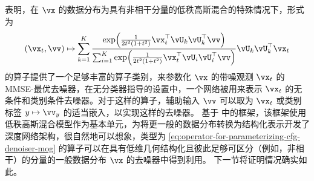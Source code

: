 \documentclass[../../book-main_zh.tex]{subfiles}
\begin{document}
 表明，在 $\vx$ 的数据分布为具有非相干分量的低秩高斯混合的特殊情况下，形式为
\begin{equation}\label{eq:operator-for-parameterizing-cfg-denoiser-mog}
  (\vx_t, \vv) \mapsto
  \sum_{k = 1}^{K}\frac{
    \exp\rp{\frac{1}{2t^{2}(1
    + t^{2})}\vx_t^\top \vU_k \vU_k^\top \vv}
  }
  {
    \sum_{i
    = 1}^{K}\exp\rp{\frac{1}{2t^{2}(1
    + t^{2})}\vx_t^\top \vU_i \vU_i^\top \vv}
  }
  \vU_{k}\vU_{k}^{\top}\vx_t
\end{equation}
的算子提供了一个足够丰富的算子类别，来参数化 $\vx$ 的带噪观测 $\vx_t$ 的 MMSE-最优去噪器，在无分类器指导的设置中，一个网络被用来表示 $\vx_t$ 的无条件和类别条件去噪器。对于这样的算子，辅助输入 $\vv$ 可以取为 $\vx_t$ 或类别标签 $y \mapsto \vv_y$ 的适当嵌入，以实现这样的去噪器。
基于  中的框架，该框架使用低秩高斯混合模型作为基本单元，为将更一般的数据分布转换为结构化表示开发了深度网络架构，很自然地可以想象，类型为 \eqref{eq:operator-for-parameterizing-cfg-denoiser-mog} 的算子可以在具有低维几何结构化且彼此足够可区分（例如，非相干）的分量的一般数据分布 $\vx$ 的去噪器中得到利用。
下一节将证明情况确实如此。
\end{document}

